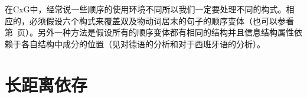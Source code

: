 在CxG中，经常说一些顺序的使用环境不同所以我们一定要处理不同的构式。相应的，必须假设六个构式来覆盖双及物动词居末的句子的顺序变体（也可以参看第~\pageref{Regeln-PSG-Abfolge}页）。另外一种方法是假设所有的顺序变体都有相同的结构并且信息结构属性依赖于各自结构中成分的位置（见\citealp{deKuthy2000a}对德语的分析和\citealp{Bildhauer2008a}对于西班牙语的分析）。

\section{长距离依存}

